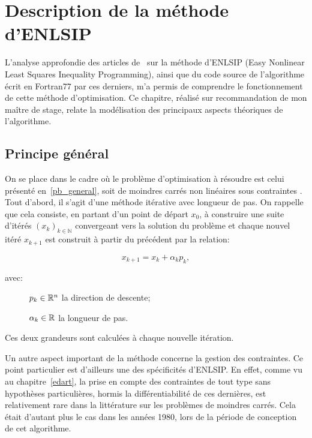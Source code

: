 \chapter{Description de la méthode d'ENLSIP}\label{Travail}
 

L'analyse approfondie des articles de~\citet{lindstromwedin1984,lindwedin88} sur la méthode d'ENLSIP (Easy Nonlinear Least Squares Inequality Programming), 
ainsi que du code source de l'algorithme écrit en Fortran77 par ces derniers, m'a permis de comprendre le fonctionnement de cette méthode d'optimisation. Ce chapitre, réalisé sur recommandation de mon maître de stage, 
relate la modélisation des principaux aspects théoriques de l'algorithme. 


\section{Principe général}\label{travail:principe_general}

On se place dans le cadre où le problème d'optimisation à résoudre est celui présenté en~\eqref{pb_general}, soit de moindres carrés non linéaires sous contraintes .
Tout d'abord, il s'agit d'une méthode itérative avec longueur de pas. On rappelle que cela consiste, en partant d'un point de départ $x_0$, à construire une suite
d'itérés $(x_k)_{k\in \mathbb{N}}$ convergeant vers la solution du problème et chaque nouvel itéré $x_{k+1}$ est construit à partir du précédent par la relation:

\[x_{k+1}=x_k+\alpha_kp_k,\]

avec:
\begin{description}
    \item[\textbullet] $p_k\in\mathbb{R}^n$ la direction de descente;
    \item[\textbullet] $\alpha_k\in\mathbb{R}$ la longueur de pas.
\end{description}

Ces deux grandeurs sont calculées à chaque nouvelle itération.

Un autre aspect important de la méthode concerne la gestion des contraintes. Ce point particulier est d'ailleurs une des spécificités d'ENLSIP. En effet, comme vu au 
chapitre~\ref{edart}, la prise en compte des contraintes de tout type sans hypothèses particulières, hormis la différentiabilité de ces dernières, est 
relativement rare dans la littérature sur les problèmes de moindres carrés. Cela était d'autant plus le cas dans les années 1980, lors de la période de conception de 
cet algorithme.

